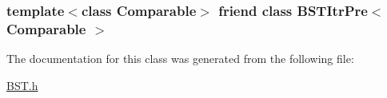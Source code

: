 \hypertarget{class_binary_node_a45a55df6f11541416d4ea7684c575c1a}{
\subsubsection[{B\-S\-T\-Itr\-Pre$<$ Comparable $>$}]{\setlength{\rightskip}{0pt plus 5cm}template$<$class Comparable$>$ friend class {\bf B\-S\-T\-Itr\-Pre}$<$ Comparable $>$\hspace{0.3cm}{\ttfamily [friend]}}}\label{class_binary_node_a45a55df6f11541416d4ea7684c575c1a}


The documentation for this class was generated from the following file\-:\begin{DoxyCompactItemize}
\item 
\hyperlink{_b_s_t_8h}{B\-S\-T.\-h}\end{DoxyCompactItemize}
